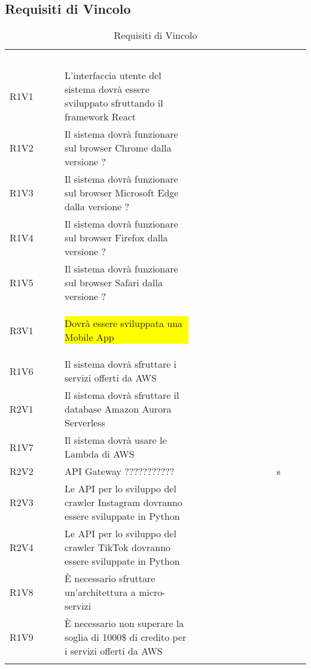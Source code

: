 \subsection{Requisiti di Vincolo}


\renewcommand{\arraystretch}{1.5}
\begin{longtable}{ m{}<{\centering}  m{}<{\centering}  m{}<{\centering}  m{}<{\centering}}
	\rowcolor{darkblue}
	\textcolor{white}{\textbf{Requisito}} &\textcolor{white}{\textbf{Descrizione}}& \textcolor{white}{\textbf{Classificazione}} & \textcolor{white}{\textbf{Fonti}}\\ 

	R1V1 & L’interfaccia utente del sistema dovrà essere sviluppato sfruttando il framework React & \Ob & \Vi \\	

	R1V2 & Il sistema dovrà funzionare sul browser Chrome dalla versione ? & \Ob & \Vi \\	
	 
	R1V3 & Il sistema dovrà funzionare sul browser Microsoft Edge dalla versione ? & \Ob & \Vi \\	

	R1V4 & Il sistema dovrà funzionare sul browser Firefox dalla versione ? & \Ob & \Vi \\	
	 
	R1V5 & Il sistema dovrà funzionare sul browser Safari dalla versione ? & \Ob & \Vi \\	
	 
	R3V1 & {\colorbox{yellow}{\parbox{0.35\textwidth}{Dovrà essere sviluppata una Mobile App}}} & \Fa & \Ca \\	
	 
	R1V6 & Il sistema dovrà sfruttare i servizi offerti da AWS & \Ob & \Ca \\	
	 
	R2V1 & Il sistema dovrà sfruttare il database Amazon Aurora Serverless & \De & \Vi \\
	
	R1V7 & Il sistema dovrà usare le Lambda di AWS & \Ob & \Ca \\	
	 
	R2V2 & API Gateway ??????????? & \De & s\\	 

	R2V3 & Le API per lo sviluppo del crawler Instagram dovranno essere sviluppate in Python & \De & \Vi \\	
	 
	R2V4 & Le API per lo sviluppo del crawler TikTok dovranno essere sviluppate in Python & \De & \Vi \\	
	 
	R1V8 & È necessario sfruttare un’architettura a micro-servizi & \Ob & \Ca \\	
	 
	R1V9 & È necessario non superare la soglia di 1000\$ di credito per i servizi offerti da AWS & \Ob & \Ve \\	
	
	\caption{Requisiti di Vincolo}
\end{longtable}

\pagebreak